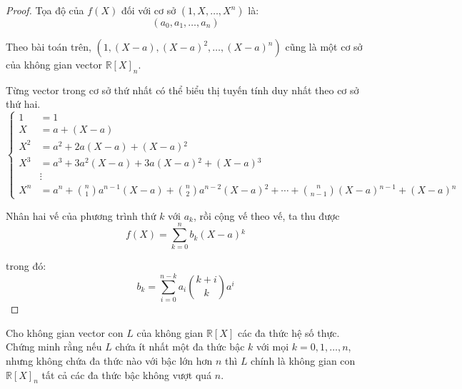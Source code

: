 \begin{proof}Tọa độ của $f(X)$ đối với cơ sở $(1, X, \ldots, X^{n})$ là:
    \[ (a_{0}, a_{1}, \ldots, a_{n}) \]
    
    Theo bài toán trên, $(1, (X - a), {(X - a)}^{2}, \ldots, {(X - a)}^{n})$ cũng là một cơ sở của không gian vector ${\mathbb{R}[X]}_{n}$.
    
    Từng vector trong cơ sở thứ nhất có thể biểu thị tuyến tính duy nhất theo cơ sở thứ hai.
    \[
        \begin{cases}
            1     & = 1                                                                                                                      \\
            X     & = a + (X-a)                                                                                                              \\
            X^{2} & = a^{2} + 2a(X-a) + (X-a){}^{2}                                                                                          \\
            X^{3} & = a^{3} + 3a^{2}(X-a) + 3a(X-a){}^{2} + (X-a){}^{3}                                                                      \\
                  & \vdots                                                                                                                   \\
            X^{n} & = a^{n} + \binom{n}{1}a^{n-1}(X-a) + \binom{n}{2}a^{n-2}(X-a){}^{2} + \cdots + \binom{n}{n-1}(X-a){}^{n-1} + (X-a){}^{n}
        \end{cases}
    \]
    
    Nhân hai vế của phương trình thứ $k$ với $a_{k}$, rồi cộng vế theo vế, ta thu được
    \[
        f(X) = \sum^{n}_{k=0}b_{k}(X-a){}^{k}
    \]
    
    trong đó:
    \[
        b_{k} = \sum^{n-k}_{i=0}a_{i}\binom{k+i}{k}a^{i}
    \]
\end{proof}

\begin{exercise}
    Cho không gian vector con $L$ của không gian $\mathbb{R}[X]$ các đa thức hệ số thực. Chứng minh rằng nếu $L$ chứa ít nhất một đa thức bậc $k$ với mọi $k = 0, 1,\ldots, n$, nhưng không chứa đa thức nào với bậc lớn hơn $n$ thì $L$ chính là không gian con ${\mathbb{R}[X]}_{n}$ tất cả các đa thức bậc không vượt quá $n$.
\end{exercise}

